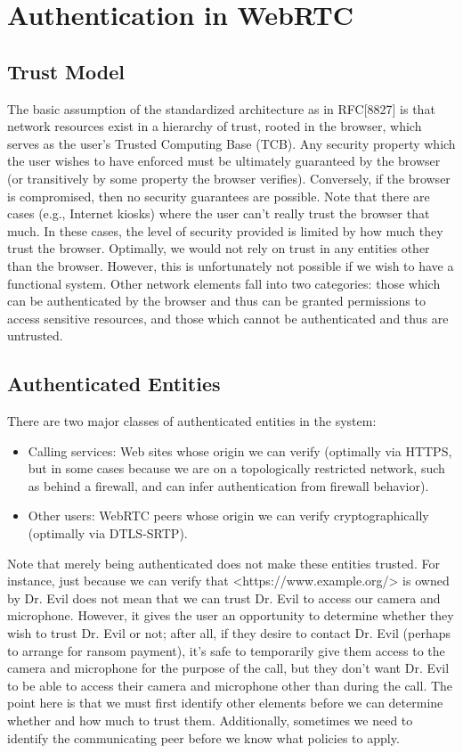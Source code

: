 \documentclass[conference]{IEEEtran}
\begin{document}
\section{Authentication in WebRTC}
\subsection{Trust Model}

The basic assumption of the standardized architecture as in RFC[8827]\cite{RFC8827} is that network resources exist in a hierarchy of trust, rooted in the browser, 
which serves as the user's Trusted Computing Base (TCB). Any security property which the user wishes to have enforced must be 
ultimately guaranteed by the browser (or transitively by some property the browser verifies). Conversely, if the browser is 
compromised, then no security guarantees are possible. Note that there are cases (e.g., Internet kiosks) where the user can't 
really trust the browser that much. In these cases, the level of security provided is limited by how much they trust the browser.
Optimally, we would not rely on trust in any entities other than the browser. However, this is unfortunately not possible 
if we wish to have a functional system. Other network elements fall into two categories: those which can be authenticated by 
the browser and thus can be granted permissions to access sensitive resources, and those which cannot be authenticated and 
thus are untrusted.

\subsection{Authenticated Entities}
There are two major classes of authenticated entities in the system:
\begin{itemize}
    \item Calling services: Web sites whose origin we can verify (optimally via HTTPS, but in some cases because we are on a topologically restricted 
    network, such as behind a firewall, and can infer authentication from firewall behavior).
    \item Other users: WebRTC peers whose origin we can verify cryptographically (optimally via DTLS-SRTP).
\end{itemize} \cite{RFC8827}

Note that merely being authenticated does not make these entities trusted. For instance, just because we can verify that 
<https://www.example.org/> is owned by Dr. Evil does not mean that we can trust Dr. Evil to access our camera and microphone. 
However, it gives the user an opportunity to determine whether they wish to trust Dr. Evil or not; after all, if they desire to 
contact Dr. Evil (perhaps to arrange for ransom payment), it's safe to temporarily give them access to the camera and microphone 
for the purpose of the call, but they don't want Dr. Evil to be able to access their camera and microphone other than during the 
call. The point here is that we must first identify other elements before we can determine whether and how much to trust them.
 Additionally, sometimes we need to identify the communicating peer before we know what policies to apply. \cite{RFC8827}
\end{document}
